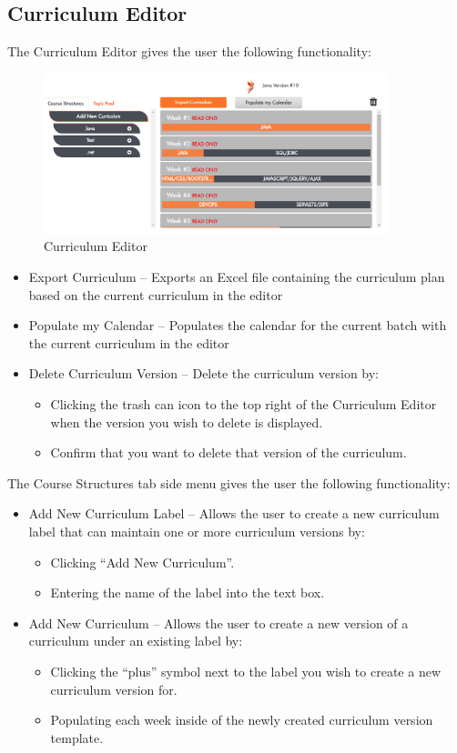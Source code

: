 \subsection{Curriculum Editor}
The Curriculum Editor gives the user the following functionality:
\begin{figure}[htp]
\centering
\includegraphics[width=10cm]{images/curriculumView}
\caption{Curriculum Editor}
\label{fig:lion}
\end{figure}

\begin{itemize}
    \item Export Curriculum – Exports an Excel file containing the curriculum plan based on the current curriculum in the editor
    \item Populate my Calendar – Populates the calendar for the current batch with the current curriculum in the editor
    \item Delete Curriculum Version – Delete the curriculum version by:
    \begin{itemize}
        \item Clicking the trash can icon to the top right of the Curriculum Editor when the version you wish to delete is displayed.
        \item Confirm that you want to delete that version of the curriculum.
    \end{itemize}
\end{itemize}
The Course Structures tab side menu gives the user the following functionality:
\begin{itemize}
    \item Add New Curriculum Label – Allows the user to create a new curriculum label that can maintain one or more curriculum versions by:
    \begin{itemize}
        \item Clicking “Add New Curriculum”.
        \item Entering the name of the label into the text box.
    \end{itemize}
    \item Add New Curriculum – Allows the user to create a new version of a curriculum under an existing label by:
    \begin{itemize}
        \item Clicking the “plus” symbol next to the label you wish to create a new curriculum version for.
        \item Populating each week inside of the newly created curriculum version template.
    \end{itemize}
\end{itemize}

